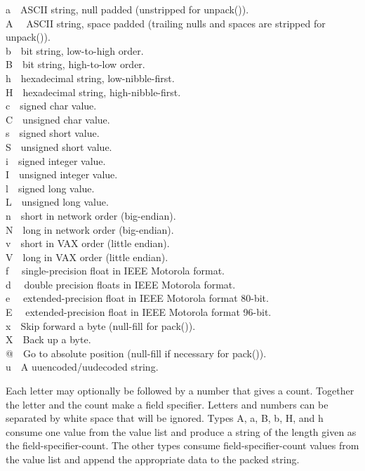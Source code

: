 a\ \ ASCII string, null padded (unstripped for
\textsf{unpack()}).\\
A \ \ ASCII string, space padded (trailing nulls and spaces are stripped
for \textsf{unpack()}).\\
b\ \ bit string, low-to-high order.\\
B\ \ bit string, high-to-low order.\\
h\ \ hexadecimal string, low-nibble-first.\\
H\ \ hexadecimal string, high-nibble-first.\\
c\ \ signed char value.\\
C\ \ unsigned char value.\\
s\ \ signed short value.\\
S\ \ unsigned short value.\\
i\ \ signed integer value.\\
I\ \ unsigned integer value.\\
l\ \ signed long value.\\
L\ \ unsigned long value.\\
n\ \ short in {\textquotedbl}network{\textquotedbl} order
(big-endian).\\
N\ \ long in {\textquotedbl}network{\textquotedbl} order
(big-endian).\\
v\ \ short in VAX order (little endian).\\
V\ \ long in VAX order (little endian).\\
f \ \ single-precision float in IEEE Motorola format.\\
d \ \ double precision floats in IEEE Motorola format.\\
e \ \ extended-precision float in IEEE Motorola format 80-bit.\\
E \ \ extended-precision float in IEEE Motorola format 96-bit.\\
x\ \ Skip forward a byte (null-fill for pack()).\\
X\ \ Back up a byte.\\
@\ \ Go to absolute position (null-fill if necessary for
pack()).\\
u\ \ A uuencoded/uudecoded string.

Each letter may optionally be followed by a number that gives a count.
Together the letter and the count make a field specifier. Letters and
numbers can be separated by white space that will be ignored. Types A,
a, B, b, H, and h consume one value from the
{\textquotedbl}value{\textquotedbl} list and produce a string of the
length given as the field-specifier-count. The other types consume
{\textquotedbl}field-specifier-count{\textquotedbl} values from the
{\textquotedbl}value{\textquotedbl} list and append the appropriate
data to the packed string.

